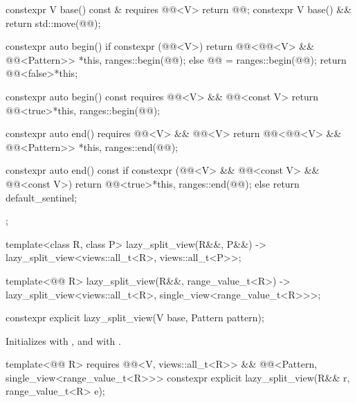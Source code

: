 \begin{codeblock}
{{    constexpr V base() const & requires @@<V> { return @@; }
    constexpr V base() && { return std::move(@@); }

    constexpr auto begin() {
      if constexpr (@@<V>) {
        return @@<@@<V> && @@<Pattern>>
          {*this, ranges::begin(@@)};
      } else {
        @@ = ranges::begin(@@);
        return @@<false>{*this};
      }
    }

    constexpr auto begin() const requires @@<V> && @@<const V> {
      return @@<true>{*this, ranges::begin(@@)};
    }

    constexpr auto end() requires @@<V> && @@<V> {
      return @@<@@<V> && @@<Pattern>>
        {*this, ranges::end(@@)};
    }

    constexpr auto end() const {
      if constexpr (@@<V> && @@<const V> && @@<const V>)
        return @@<true>{*this, ranges::end(@@)};
      else
        return default_sentinel;
    }
  };

  template<class R, class P>
    lazy_split_view(R&&, P&&) -> lazy_split_view<views::all_t<R>, views::all_t<P>>;

  template<@@ R>
    lazy_split_view(R&&, range_value_t<R>)
      -> lazy_split_view<views::all_t<R>, single_view<range_value_t<R>>>;
}
\end{codeblock}

%
\begin{itemdecl}
constexpr explicit lazy_split_view(V base, Pattern pattern);
\end{itemdecl}

\begin{itemdescr}
\pnum
\effects
Initializes  with , and
 with .
\end{itemdescr}

%
\begin{itemdecl}
template<@@ R>
  requires @@<V, views::all_t<R>> &&
           @@<Pattern, single_view<range_value_t<R>>>
constexpr explicit lazy_split_view(R&& r, range_value_t<R> e);
\end{itemdecl}

